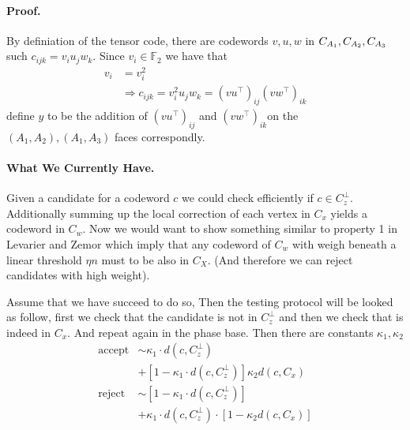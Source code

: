 \documentclass{article}
\begin{document}
\begin{multicols*}{2}
    \paragraph{Proof.} By definiation of the tensor code, there are codewords $v,u,w$ in $C_{A_{1}}, C_{A_{2}}, C_{A_{3}}$ such $ c_{ijk} = v_{i}u_{j}w_{k}$. Since $v_{i} \in \mathbb{F}_{2}$ we have that
    \begin{equation*}
      \begin{split}
	 v_{i} &= v_{i}^{2} \\
	 &\Rightarrow c_{ijk}= v_{i}^{2}u_{j}w_{k}=\left( vu^{\top} \right)_{ij}\left( vw^{\top} \right)_{ik}
      \end{split}
    \end{equation*}
    define $y$ to be the addition of  $\left( vu^{\top} \right)_{ij}$ and $\left( vw^{\top} \right)_{ik}$on the $\left(A_{1},A_{2}  \right), \left(A_{1}, A_{3}\right) $ faces correspondly. 

	\paragraph{What We Currently Have.} Given a candidate for a codeword $c$ we could check efficiently if $c\in C_{z}^\perp$.  
	Additionally summing up the local correction of each vertex in $C_{x}$ yields a codeword in $C_{w}$. Now we would want to show 
	something similar to property 1 in Levarier and Zemor which imply that any codeword of $C_{w}$ with weigh beneath 
	a linear threshold $\eta n $ must to be also in $C_{X}$. (And therefore we can reject candidates with high weight). 

	Assume that we have succeed to do so, Then the testing protocol will be looked as follow, 
	first we check that the candidate is not in $C_{z}^\perp$ and then we check that is indeed in $C_{x}$. And repeat again 
	in the phase base. Then there are constants $\kappa_1, \kappa_2$ 
	\begin{equation*}
	  \begin{split}
	    \text{accept} & \sim \kappa_1 \cdot  d\left( c,C_{z}^\perp \right)  \\ 
	    & +  \left[ 1 -  \kappa_1 \cdot  d\left( c,C_{z}^\perp \right)\right] \kappa_{2} d\left( c, C_{x} \right) \\
	    \text{reject} & \sim  \left[ 1 -  \kappa_1 \cdot  d\left( c,C_{z}^\perp \right)\right] \\ 
	    & +\kappa_1 \cdot  d\left( c,C_{z}^\perp \right) \cdot \left[ 1 - \kappa_{2} d\left( c, C_{x} \right) \right] 
	  \end{split}
	\end{equation*}

\end{multicols*}
\end{document}
